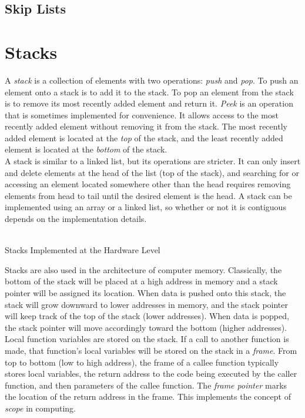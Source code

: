 \subsection{Skip Lists}

\section{Stacks}

A \textit{stack} is a collection of elements with two operations: \textit{push} and \textit{pop}. To push an element onto a stack is to add it to the stack. To pop an element from the stack is to remove its most recently added element and return it. \textit{Peek} is an operation that is sometimes implemented for convenience. It allows access to the most recently added element without removing it from the stack. The most recently added element is located at the \textit{top} of the stack, and the least recently added element is located at the \textit{bottom} of the stack. \\

A stack is similar to a linked list, but its operations are stricter. It can only insert and delete elements at the head of the list (top of the stack), and searching for or accessing an element located somewhere other than the head requires removing elements from head to tail until the desired element is the head. A stack can be implemented using an array or a linked list, so whether or not it is contiguous depends on the implementation details. \\\\

\begin{bluebox}{Stacks Implemented at the Hardware Level}

    Stacks are also used in the architecture of computer memory. Classically, the bottom of the stack will be placed at a high address in memory and a stack pointer will be assigned its location. When data is pushed onto this stack, the stack will grow downward to lower addresses in memory, and the stack pointer will keep track of the top of the stack (lower addresses). When data is popped, the stack pointer will move accordingly toward the bottom (higher addresses). \\
    
    Local function variables are stored on the stack. If a call to another function is made, that function's local variables will be stored on the stack in a \textit{frame}. From top to bottom (low to high address), the frame of a callee function typically stores local variables, the return address to the code being executed by the caller function, and then parameters of the callee function. The \textit{frame pointer} marks the location of the return address in the frame. This implements the concept of \textit{scope} in computing.

\end{bluebox}

